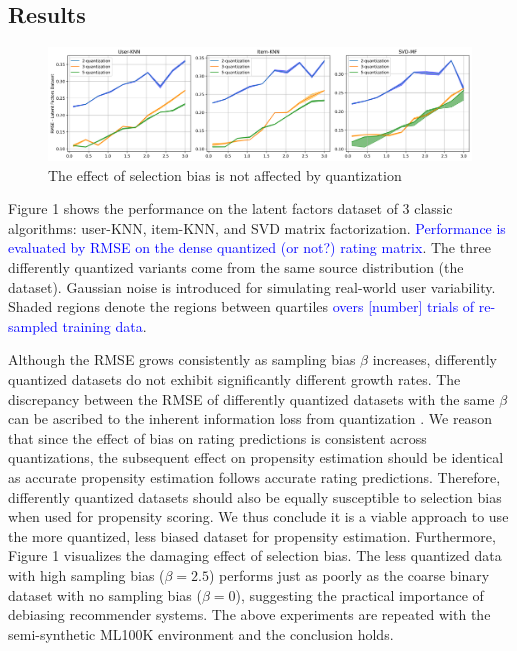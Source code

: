 \documentclass{article}
\begin{document}
\subsection{Results}
\begin{figure}
  \centering
  \includegraphics[width=\textwidth]{1.png}
  \caption{The effect of selection bias is not affected by quantization}
\end{figure}
Figure 1 shows the performance on the latent factors dataset of 3 classic algorithms: user-KNN, item-KNN, and SVD matrix factorization. \textcolor{blue}{Performance is evaluated by RMSE on the dense quantized (or not?) rating matrix}. The three differently quantized variants come from the same source distribution (the dataset). Gaussian noise is introduced for simulating real-world user variability. Shaded regions denote the regions between quartiles \textcolor{blue}{overs [number] trials of re-sampled training data}. 

Although the RMSE grows consistently as sampling bias $\beta$ increases, differently quantized datasets do not exhibit significantly different growth rates. The discrepancy between the RMSE of differently quantized datasets with the same $\beta$ can be ascribed to the inherent information loss from quantization \cite{widrow1996statistical}. We reason that since the effect of bias on rating predictions is consistent across quantizations, the subsequent effect on propensity estimation should be identical as accurate propensity estimation follows accurate rating predictions. Therefore, differently quantized datasets should also be equally susceptible to selection bias when used for propensity scoring. We thus conclude it is a viable approach to use the more quantized, less biased dataset for propensity estimation. Furthermore, Figure 1 visualizes the damaging effect of selection bias. 
The less quantized data with high sampling bias ($\beta=2.5$) performs just as poorly as the coarse binary dataset with no sampling bias ($\beta=0$),
suggesting the practical importance of debiasing recommender systems. 
The above experiments are repeated with the semi-synthetic ML100K environment and the conclusion holds.
\end{document}
